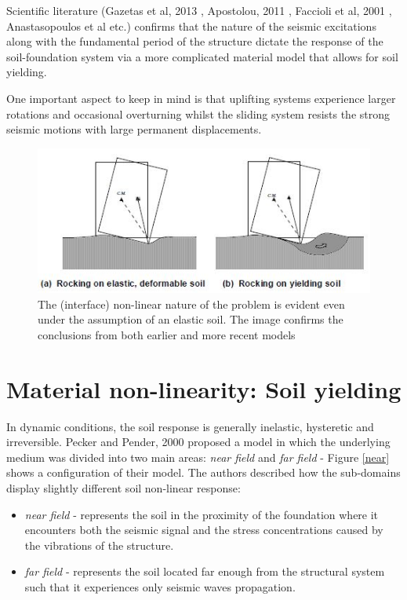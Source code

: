 \documentclass[11pt,a4paper]{report}
\begin{document}
Scientific literature (Gazetas et al, 2013 \cite{gazetas2013nonlinear}, Apostolou, 2011 \cite{apostolou2011soil}, Faccioli et al, 2001 \cite{faccioli2001investigation}, Anastasopoulos et al \cite{anastasopoulos2010soil} etc.) confirms that the nature of the seismic excitations along with the fundamental period of the structure dictate the response of the soil-foundation system via a more complicated material model that allows for soil yielding. 

One important aspect to keep in mind is that uplifting systems experience larger rotations and occasional overturning whilst the sliding system resists the strong seismic motions with large permanent displacements.

\begin{figure}[h!]
	\centering
	\includegraphics[width=0.7\linewidth]{"rocking"}
	\caption{The (interface) non-linear nature of the problem is evident even under the assumption of an elastic soil. The image confirms the conclusions from both earlier and more recent models }
	\label{rocking}
\end{figure}

\section{Material non-linearity: Soil yielding}
In dynamic conditions, the soil response is generally inelastic, hysteretic and irreversible. Pecker and Pender, 2000 \cite{pecker2000earthquake} proposed a model in which the underlying medium was divided into two main areas: \textit{near field} and \textit{far field} - Figure \ref{near} shows a configuration of their model. The authors described how the sub-domains display slightly different soil non-linear response:

\begin{itemize}
	\item \textit{near field} - represents the soil in the proximity of the foundation where it encounters both the seismic signal and the stress concentrations caused by the vibrations of the structure. 
	\item \textit{far field} - represents the soil located far enough from the structural system such that it experiences only seismic waves propagation.
\end{itemize}
 
\end{document}
